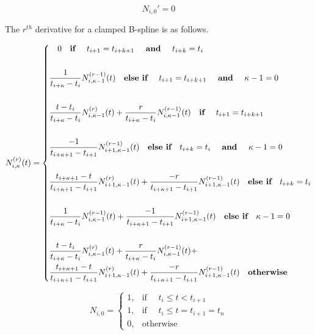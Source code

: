 \documentclass{article}
\begin{document}
   \begin{equation}
      N_{i,0}' = 0
  \end{equation}
  
 The \(r^{th}\) derivative for a clamped B-spline is as follows.
 
 \begin{equation} \label{eq:Basis function equation}
  N_{i,\kappa}^{(r)}(t) = \begin{dcases}  \quad 0 \quad  \textbf{if } \quad t_{i+1} = t_{i+k+1} \quad  \textbf{ and } \quad t_{i+k} = t_{i} \\  \\
 \frac{1}{t_{i+\kappa} - t_i} N_{i,\kappa-1}^{(r-1)}(t) \quad  \textbf{else if } \quad t_{i+1} = t_{i+k+1}  \quad  \textbf{ and }  \quad \kappa-1 = 0 \\ \\ 
  \frac{t - t_i}{t_{i+\kappa} - t_i} N_{i,\kappa-1}^{(r)}(t) + \frac{r}{t_{i+\kappa} - t_i} N_{i,\kappa-1}^{(r-1)}(t) \quad  \textbf{if } \quad t_{i+1} = t_{i+k+1}\\ \\ 
  \frac{-1}{t_{i+\kappa+1}-t_{i+1}} N_{i+1 , \kappa-1}^{(r-1)}(t) \quad \textbf{else if} \quad t_{i+k} = t_{i} \quad  \textbf{ and }  \quad \kappa-1 = 0 \\ \\
  \frac{t_{i+\kappa+1} - t}{t_{i+\kappa+1}-t_{i+1}} N_{i+1 , \kappa-1}^{(r)}(t) +  \frac{-r}{t_{i+\kappa+1}-t_{i+1}} N_{i+1 , \kappa-1}^{(r-1)}(t) \quad \textbf{else if} \quad t_{i+k} = t_{i} \\ \\
  \frac{1}{t_{i+\kappa} - t_i} N_{i,\kappa-1}^{(r-1)}(t) +  \frac{-1}{t_{i+\kappa+1}-t_{i+1}} N_{i+1 , \kappa-1}^{(r-1)}(t) \quad \textbf{else if}  \quad \kappa-1 = 0 \\ \\
  \frac{t - t_i}{t_{i+\kappa} - t_i} N_{i,\kappa-1}^{(r)}(t) + \frac{r}{t_{i+\kappa} - t_i} N_{i,\kappa-1}^{(r-1)}(t) + \\
  \frac{t_{i+\kappa+1} - t}{t_{i+\kappa+1}-t_{i+1}} N_{i+1 , \kappa-1}^{(r)}(t) +  \frac{-r}{t_{i+\kappa+1}-t_{i+1}} N_{i+1 , \kappa-1}^{(r-1)}(t) \quad \textbf{otherwise}
  \end{dcases}
  \end{equation}
  
 \hspace{1cm}
 
 \begin{equation} \label{eq:Basis function equation zeros}
      N_{i,0} =   \begin{cases} 1, &  \text{if } \quad t_i \leq t < t_{i+1} \\
                            1, & \text{if } \quad t_i \leq t = t_{i+1} = t_n \\
                            0, & \text{otherwise} \end{cases}
  \end{equation}
  
\end{document}
